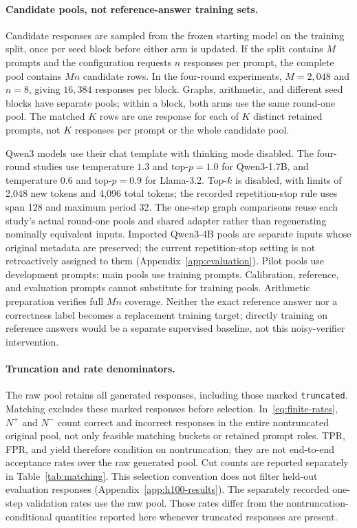 \paragraph{Candidate pools, not reference-answer training sets.}
Candidate responses are sampled from the frozen starting model on the
training split, once per seed block before either arm is updated. If the
split contains $M$ prompts and the configuration requests $n$ responses per
prompt, the complete pool contains $Mn$ candidate rows. In the four-round
experiments, $M=2{,}048$ and $n=8$, giving $16{,}384$ responses per block.
Graphs, arithmetic, and different seed blocks have separate pools; within a
block, both arms use the same round-one pool.
The matched $K$ rows are one response for each of $K$ distinct retained
prompts, not $K$ responses per prompt or the whole candidate pool.

Qwen3 models use their chat template with thinking mode disabled.
The four-round studies use temperature $1.3$ and top-$p=1.0$ for
Qwen3-1.7B, and temperature $0.6$ and top-$p=0.9$ for Llama-3.2.
Top-$k$ is disabled, with limits of 2,048 new tokens and 4,096 total tokens;
the recorded repetition-stop rule uses span 128 and maximum period 32.
The one-step graph comparisons reuse each study's actual round-one pools
and shared adapter rather than regenerating nominally equivalent inputs.
Imported Qwen3-4B pools are separate inputs whose original metadata are
preserved; the current repetition-stop setting is not retroactively assigned
to them (Appendix~\ref{app:evaluation}). Pilot pools use development
prompts; main pools use training prompts. Calibration,
reference, and evaluation prompts cannot substitute for training pools.
Arithmetic preparation verifies full $Mn$ coverage. Neither
the exact reference answer nor a correctness label becomes a replacement
training target; directly training on reference answers would be a separate
supervised baseline, not this noisy-verifier intervention.

\paragraph{Truncation and rate denominators.}
The raw pool retains all generated responses, including those marked
\texttt{truncated}. Matching excludes these marked responses before selection.
In~\eqref{eq:finite-rates}, $N^+$ and $N^-$ count correct and incorrect
responses in the entire nontruncated original pool, not only feasible
matching buckets or retained prompt roles. TPR, FPR, and yield therefore
condition on nontruncation; they are not end-to-end acceptance rates over
the raw generated pool. Cut counts are reported separately in
Table~\ref{tab:matching}. This selection convention does not filter
held-out evaluation responses (Appendix~\ref{app:h100-results}).
The separately recorded one-step validation rates use the raw pool.
Those rates differ from the nontruncation-conditional quantities reported
here whenever truncated responses are present.

